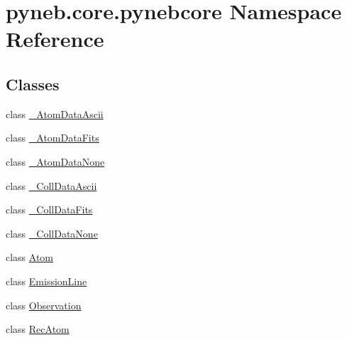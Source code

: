 \hypertarget{namespacepyneb_1_1core_1_1pynebcore}{}\section{pyneb.\+core.\+pynebcore Namespace Reference}
\label{namespacepyneb_1_1core_1_1pynebcore}
\subsection*{Classes}
\begin{DoxyCompactItemize}
\item 
class \hyperlink{classpyneb_1_1core_1_1pynebcore_1_1___atom_data_ascii}{\+\_\+\+Atom\+Data\+Ascii}
\item 
class \hyperlink{classpyneb_1_1core_1_1pynebcore_1_1___atom_data_fits}{\+\_\+\+Atom\+Data\+Fits}
\item 
class \hyperlink{classpyneb_1_1core_1_1pynebcore_1_1___atom_data_none}{\+\_\+\+Atom\+Data\+None}
\item 
class \hyperlink{classpyneb_1_1core_1_1pynebcore_1_1___coll_data_ascii}{\+\_\+\+Coll\+Data\+Ascii}
\item 
class \hyperlink{classpyneb_1_1core_1_1pynebcore_1_1___coll_data_fits}{\+\_\+\+Coll\+Data\+Fits}
\item 
class \hyperlink{classpyneb_1_1core_1_1pynebcore_1_1___coll_data_none}{\+\_\+\+Coll\+Data\+None}
\item 
class \hyperlink{classpyneb_1_1core_1_1pynebcore_1_1_atom}{Atom}
\item 
class \hyperlink{classpyneb_1_1core_1_1pynebcore_1_1_emission_line}{Emission\+Line}
\item 
class \hyperlink{classpyneb_1_1core_1_1pynebcore_1_1_observation}{Observation}
\item 
class \hyperlink{classpyneb_1_1core_1_1pynebcore_1_1_rec_atom}{Rec\+Atom}
\end{DoxyCompactItemize}
